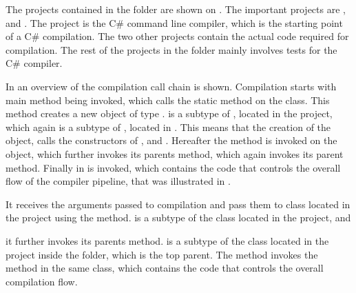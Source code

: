 The projects contained in the  folder are shown on . The important projects are ,  and . The  project is the C\# command line compiler, which is the starting point of a C\# compilation. The two other projects contain the actual code required for compilation. The rest of the projects in the  folder mainly involves tests for the C\# compiler.

In  an overview of the compilation call chain is shown. Compilation starts with  main method being invoked, which calls the static  method on the  class. This method creates a new  object of type .  is a subtype of , located in the  project, which again is a subtype of , located in . This means that the creation of the  object, calls the constructors of ,  and . Hereafter the  method is invoked on the  object, which further invokes its parents  method, which again invokes its parent  method. Finally  in  is invoked, which contains the code that controls the overall flow of the compiler pipeline, that was illustrated in . 









It receives the arguments passed to compilation and pass them to  class located in the  project using the  method.  is a subtype of the  class located in the  project, and 

it further invokes its parents  method.  is a subtype of the class  located in the  project inside the  folder, which is the top parent. The  method invokes the  method in the same class, which contains the code that controls the overall compilation flow.

